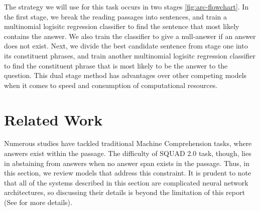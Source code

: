 The strategy we will use for this task occurs in two stages \ref{fig:arc-flowchart}. In the first stage, we break the reading passages into sentences, and train a multinomial logisitc regression classifier to find the sentence that most likely contains the answer. We also train the classifier to give a null-answer if an answer does not exist. Next, we divide the best candidate sentence from stage one into its constituent phrases, and train another multinomial logisitc regression classifier to find the constituent phrase that is most likely to be the answer to the question. This dual stage method has advantages over other competing models when it comes to speed and consumption of computational resources. 




\section{Related Work}

Numerous studies \citep{BahdanauBJGVB17, WangJ16a, XiongZS16} have tackled traditional Machine Comprehension tasks, where answers exist within the passage. The difficulty of SQUAD 2.0 task, though, lies in abstaining from answers when no answer span exists in the passage. Thus, in this section, we review models that address this constraint. It is prudent to note that all of the systems described in this section are complicated neural network architectures, so discussing their details is beyond the limitation of this report (See  \citep{chen2018neural} for more details). 

